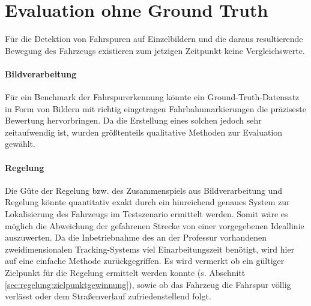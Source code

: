   
\section{Evaluation ohne Ground Truth}
\label{ssec:evaluation:messungen:ohnegt}
Für die Detektion von Fahrspuren auf Einzelbildern und die daraus resultierende Bewegung des Fahrzeugs existieren zum jetzigen Zeitpunkt keine Vergleichswerte. 

\paragraph{Bildverarbeitung} 
Für ein Benchmark der Fahrspurerkennung könnte ein Ground-Truth-Datensatz in Form von Bildern mit richtig eingetragen Fahrbahnmarkierungen die präziseste Bewertung hervorbringen. Da die Erstellung eines solchen jedoch sehr zeitaufwendig ist, wurden größtenteils qualitative Methoden zur Evaluation gewählt.



\paragraph{Regelung} 
Die Güte der Regelung bzw. des Zusammenspiels aus Bildverarbeitung und Regelung könnte quantitativ exakt durch ein hinreichend genaues System zur Lokalisierung des Fahrzeugs im Testszenario ermittelt werden. Somit wäre es möglich die Abweichung der gefahrenen Strecke von einer vorgegebenen Ideallinie auszuwerten. Da die Inbetriebnahme des an der Professur vorhandenen zweidimensionalen Tracking-Systems viel Einarbeitungszeit benötigt, wird hier auf eine einfache Methode zurückgegriffen. Es wird vermerkt ob ein gültiger Zielpunkt für die Regelung ermittelt werden konnte (s. Abschnitt \ref{sec:regelung:zielpunktgewinnung}), sowie ob das Fahrzeug die Fahrspur völlig verlässt oder dem Straßenverlauf zufriedenstellend folgt.

